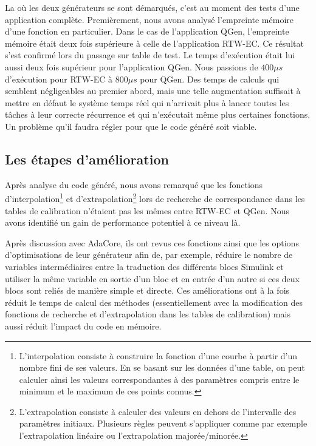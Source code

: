 La où les deux générateurs se sont démarqués, c'est au moment des tests d'une
application complète. Premièrement, nous avons analysé l'empreinte mémoire
d'une fonction en particulier. Dans le cas de l'application QGen, l'empreinte
mémoire était deux fois supérieure à celle de l'application
RTW-EC\up{\circledR}. Ce résultat s'est confirmé lors du passage sur table de
test. Le temps d'exécution était lui aussi deux fois supérieur pour
l'application QGen. Nous passions de $400\mu{}s$ d'exécution pour
RTW-EC\up{\circledR} à $800\mu{}s$ pour QGen.  Des temps de calculs qui semblent
négligeables au premier abord, mais une telle augmentation suffisait à mettre en
défaut le système temps réel qui n'arrivait plus à lancer toutes les tâches à
leur correcte récurrence et qui n'exécutait même plus certaines fonctions. Un
problème qu'il faudra régler pour que le code généré soit viable.

\subsection{Les étapes d'amélioration}
Après analyse du code généré, nous avons remarqué que les fonctions
d'interpolation\footnote{L'interpolation consiste à construire la fonction d'une
courbe à partir d'un nombre fini de ses valeurs. En se basant sur les données
d'une table, on peut calculer ainsi les valeurs correspondantes à des paramètres
compris entre le minimum et le maximum de ces points connus.} et
d'extrapolation\footnote{L'extrapolation consiste à calculer des valeurs en
dehors de l'intervalle des paramètres initiaux. Plusieurs règles peuvent
s'appliquer comme par exemple l'extrapolation linéaire ou l'extrapolation
majorée/minorée.} lors de recherche de correspondance dans les tables de
calibration n'étaient pas les mêmes entre RTW-EC\up{\circledR} et QGen. Nous avons
identifié un gain de performance potentiel à ce niveau là.

Après discussion avec AdaCore, ils ont revus ces fonctions ainsi que les options
d'optimisations de leur générateur afin de, par exemple, réduire le nombre de
variables intermédiaires entre la traduction des différents blocs
Simulink\up{\circledR} et utiliser la même variable en sortie d'un bloc et en
entrée d'un autre si ces deux blocs sont reliés de manière simple et directe.
Ces améliorations ont à la fois réduit le temps de calcul des méthodes
(essentiellement avec la modification des fonctions de recherche et
d'extrapolation dans les tables de calibration) mais aussi réduit l'impact du
code en mémoire.


